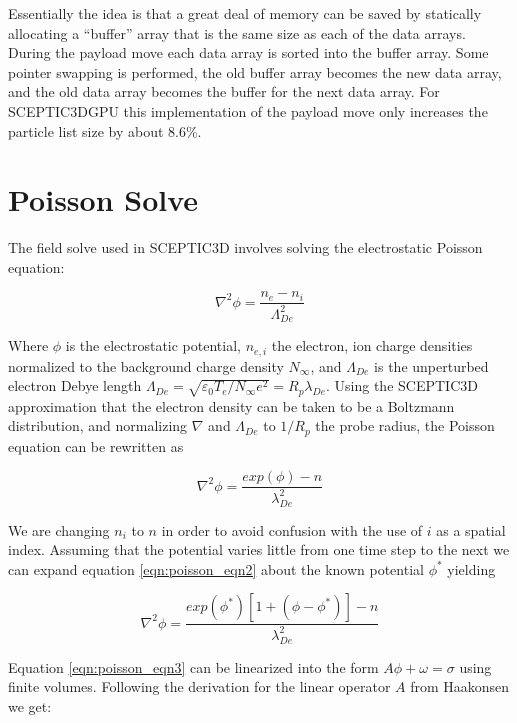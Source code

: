 		Essentially the idea is that a great deal of memory can be saved by statically allocating a ``buffer'' array that is the same size as each of the data arrays. During the payload move each data array is sorted into the buffer array. Some pointer swapping is performed, the old buffer array becomes the new data array, and the old data array becomes the buffer for the next data array. For SCEPTIC3DGPU this implementation of the payload move only increases the particle list size by about 8.6\%.



	\section{Poisson Solve}
The field solve used in SCEPTIC3D involves solving the electrostatic Poisson equation:

\begin{equation}
\nabla^2\phi=\frac{n_e-n_i}{\Lambda_{De}^2}
\label{eqn:poisson_eqn1}
\end{equation}

Where $\phi$ is the electrostatic potential, $n_{e,i}$ the electron, ion charge densities normalized to the background charge density $N_\infty$, and $\Lambda_{De}$ is the unperturbed electron Debye length $\Lambda_{De} = \sqrt{\varepsilon_0T_e/N_\infty e^2} = R_p\lambda_{De}$. Using the SCEPTIC3D approximation that the electron density can be taken to be a Boltzmann distribution, and normalizing $\nabla$ and $\Lambda_{De}$ to $1/R_p$ the probe radius, the Poisson equation can be rewritten as 

\begin{equation}
\nabla^2\phi=\frac{exp(\phi)-n}{\lambda_{De}^2}
\label{eqn:poisson_eqn2}
\end{equation}

We are changing $n_i$ to $n$ in order to avoid confusion with the use of $i$ as a spatial index. Assuming that the potential varies little from one time step to the next we can expand equation \ref{eqn:poisson_eqn2} about the known potential $\phi^*$ yielding
   
\begin{equation}
\nabla^2\phi=\frac{exp(\phi^*)[1+(\phi-\phi^*)]-n}{\lambda_{De}^2}
\label{eqn:poisson_eqn3}
\end{equation}

Equation \ref{eqn:poisson_eqn3} can be linearized into the form $A\phi+\omega = \sigma$ using finite volumes.\cite{Patacchini2010} Following the derivation for the linear operator $A$ from Haakonsen \cite{Haakonsen2011} we get:


